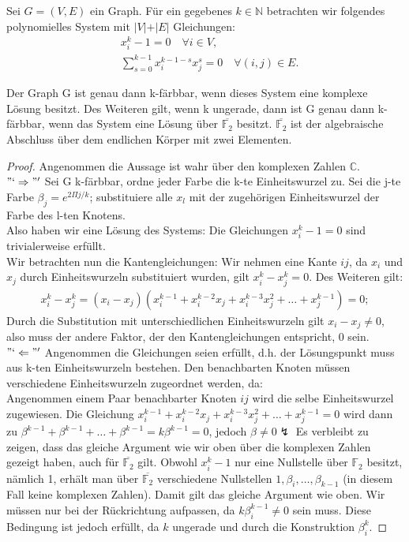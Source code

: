 \begin{lemma} \label{3color}
Sei $G = (V, E)$ ein Graph. Für ein gegebenes $k \in \mathbb{N}$ betrachten wir folgendes polynomielles System mit $\vert V \vert + \vert E \vert$ Gleichungen:
\begin{align*}
&x_i^k - 1 = 0 \quad \forall i \in V, \\
& \sum_{s = 0}^{k-1} x_i^{k-1-s}x_j^s = 0 \quad \forall (i,j) \in E.
\end{align*} 

\noindent Der Graph G ist genau dann k-färbbar, wenn dieses System eine komplexe Lösung besitzt. Des Weiteren gilt, wenn k ungerade, dann ist G genau dann k-färbbar, wenn das System eine Lösung über $\overline{\mathbb{F}_2}$ besitzt. $\overline{\mathbb{F}_2}$ ist der algebraische Abschluss über dem endlichen Körper mit zwei Elementen.
\end{lemma}

\begin{proof}
Angenommen die Aussage ist wahr über den komplexen Zahlen $\mathbb{C}$. 
\\ $"`\Rightarrow"'$ Sei G k-färbbar, ordne jeder Farbe die k-te Einheitswurzel zu. Sei die j-te Farbe $\beta_j = e^{2\Pi j/k}$; substituiere alle $x_l$ mit der zugehörigen Einheitswurzel der Farbe des l-ten Knotens. \\Also haben wir eine Lösung des Systems: Die Gleichungen $x_i^k-1 = 0$ sind trivialerweise erfüllt. \\Wir betrachten nun die Kantengleichungen: Wir nehmen eine Kante $ij$, da $x_i$ und $x_j$ durch Einheitswurzeln substituiert wurden, gilt $x_i^k - x_j^k = 0$. Des Weiteren gilt: 
\begin{align*}
x_i^k-x_j^k = (x_i-x_j)(x_i^{k-1}+x_i^{k-2}x_j+x_i^{k-3}x_j^2+\ldots+x_j^{k-1}) = 0;
\end{align*}   
Durch die Substitution mit unterschiedlichen Einheitswurzeln gilt $x_i - x_j \neq 0$, also muss der andere Faktor, der den Kantengleichungen entspricht, 0 sein.  
\\ $"`\Leftarrow"'$ Angenommen die Gleichungen seien erfüllt, d.h. der Lösungspunkt muss aus k-ten Einheitswurzeln bestehen. Den benachbarten Knoten müssen verschiedene Einheitswurzeln zugeordnet werden, da: \\
Angenommen einem Paar benachbarter Knoten $ij$ wird die selbe Einheitswurzel zugewiesen. Die Gleichung $x_i^{k-1}+x_i^{k-2}x_j+x_i^{k-3}x_j^2+\ldots+x_j^{k-1} = 0$ wird dann zu $\beta^{k-1}+\beta^{k-1}+\ldots+\beta^{k-1} = k\beta^{k-1} = 0$, jedoch $\beta \neq 0 \lightning$ 
Es verbleibt zu zeigen, dass das gleiche Argument wie wir oben über die komplexen Zahlen gezeigt haben, auch für $\overline{\mathbb{F}_2}$ gilt. Obwohl $x_i^k - 1$ nur eine Nullstelle über $\mathbb{F}_2$ besitzt, nämlich 1, erhält man über $\overline{\mathbb{F}_2}$ verschiedene Nullstellen $1,\beta_i,\ldots,\beta_{k-1}$ (in diesem Fall keine komplexen Zahlen). Damit gilt das gleiche Argument wie oben. Wir müssen nur bei der Rückrichtung aufpassen, da $k\beta_i^{k-1} \neq 0$ sein muss. Diese Bedingung ist jedoch erfüllt, da $k$ ungerade und durch die Konstruktion $\beta_i^k$. 
\end{proof}




